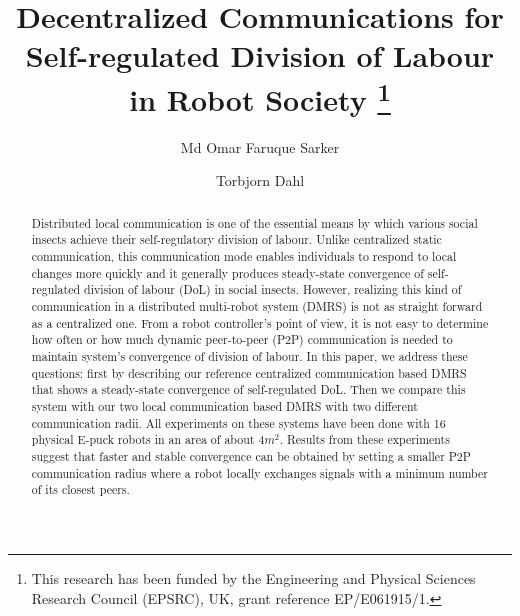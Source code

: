 \documentclass{llncs}
\begin{document}
\title{Decentralized Communications for Self-regulated Division of Labour in Robot Society
\thanks{This research has been funded by the Engineering and Physical Sciences Research Council (EPSRC), UK, grant reference EP/E061915/1.}
}
\author{Md Omar Faruque Sarker \and
	Torbjorn Dahl %
}
\maketitle
\begin{abstract}
Distributed local communication is one of the essential means by which various social insects achieve their self-regulatory division of labour. Unlike centralized static communication, this communication mode enables individuals to respond to local changes more quickly and it generally produces steady-state convergence of self-regulated division of labour (DoL) in social insects. However, realizing this kind of communication in a distributed multi-robot system (DMRS) is not as straight forward as a centralized one. From a robot controller's point of view, it is not easy to determine how often or how much dynamic peer-to-peer (P2P) communication  is needed to maintain system's convergence of division of labour. In this paper, we address these questions: first by describing our reference centralized communication based DMRS that shows a steady-state convergence of self-regulated DoL. Then we compare this system with our two local communication based DMRS with two different communication radii. All experiments on these systems  have been done with 16 physical E-puck robots in an area of about 4$m^2$. Results from these experiments suggest that faster and stable convergence can be obtained by setting a smaller P2P communication radius where a robot locally exchanges signals with a minimum number of its closest peers.
\end{abstract}
\end{document}
